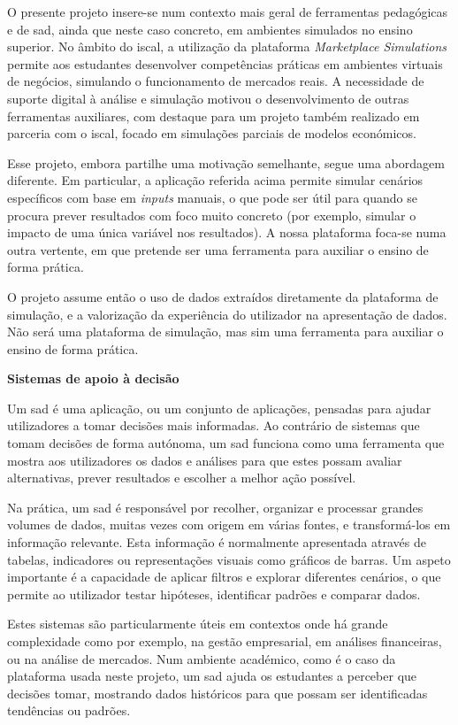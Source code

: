 O presente projeto insere-se num contexto mais geral de ferramentas pedagógicas e de \gls{sad}, ainda que neste caso concreto, em ambientes simulados no ensino superior. No âmbito do \gls{iscal}, a utilização da plataforma \textit{Marketplace Simulations} \cite{MarketplaceSim_2025} permite aos estudantes desenvolver competências práticas em ambientes virtuais de negócios, simulando o funcionamento de mercados reais. A necessidade de suporte digital à análise e simulação motivou o desenvolvimento de outras ferramentas auxiliares, com destaque para um projeto também realizado em parceria com o \gls{iscal}, focado em simulações parciais de modelos económicos.

Esse projeto, embora partilhe uma motivação semelhante, segue uma abordagem diferente. Em particular, a aplicação referida acima permite simular cenários específicos com base em \textit{inputs} manuais, o que pode ser útil para quando se procura prever resultados com foco muito concreto (por exemplo, simular o impacto de uma única variável nos resultados). A nossa plataforma foca-se numa outra vertente, em que pretende ser uma ferramenta para auxiliar o ensino de forma prática.

O projeto assume então o uso de dados extraídos diretamente da plataforma de simulação, e a valorização da experiência do utilizador na apresentação de dados. Não será uma plataforma de simulação, mas sim uma ferramenta para auxiliar o ensino de forma prática.

\noindent \textbf{Sistemas de apoio à decisão}
\label{sec:sad}

Um \gls{sad} é uma aplicação, ou um conjunto de aplicações, pensadas para ajudar utilizadores a tomar decisões mais informadas. Ao contrário de sistemas que tomam decisões de forma autónoma, um \gls{sad} funciona como uma ferramenta que mostra aos utilizadores os dados e análises para que estes possam avaliar alternativas, prever resultados e escolher a melhor ação possível.

Na prática, um \gls{sad} é responsável por recolher, organizar e processar grandes volumes de dados, muitas vezes com origem em várias fontes, e transformá-los em informação relevante. Esta informação é normalmente apresentada através de tabelas, indicadores ou representações visuais como gráficos de barras. Um aspeto importante é a capacidade de aplicar filtros e explorar diferentes cenários, o que permite ao utilizador testar hipóteses, identificar padrões e comparar dados.

Estes sistemas são particularmente úteis em contextos onde há grande complexidade como por exemplo, na gestão empresarial, em análises financeiras, ou na análise de mercados. Num ambiente académico, como é o caso da plataforma usada neste projeto, um \gls{sad} ajuda os estudantes a perceber que decisões tomar, mostrando dados históricos para que possam ser identificadas tendências ou padrões.


